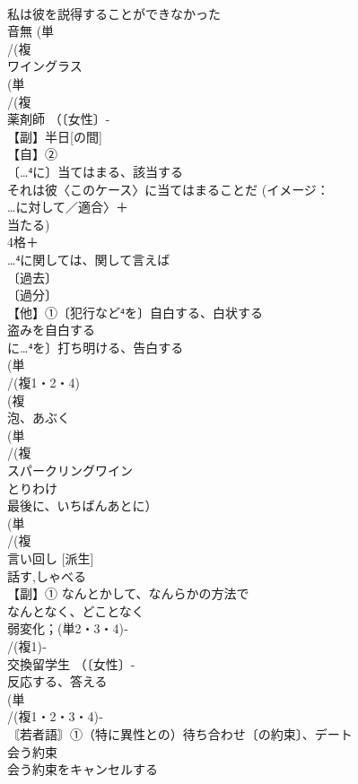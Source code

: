 \documentclass[8pt]{extreport}
\begin{document}
\begin{CJK}{UTF8}{min}
\\	私は彼を説得することができなかった
\\	音無	(単
\\	/(複
\\	ワイングラス 
\\	(単
\\	/(複
\\	薬剤師 （〔女性〕-
\\	【副】半日[の間] 
\\	【自】②
\\	〔…⁴に〕当てはまる、該当する 
\\	それは彼〈このケース〉に当てはまることだ (イメージ： 
\\	…に対して／適合〉＋
\\	当たる)
\\	4格＋
\\	…⁴に関しては、関して言えば
\\	〔過去〕
\\	〔過分〕
\\	【他】①〔犯行など⁴を〕自白する、白状する 
\\	盗みを自白する 
\\	に…⁴を〕打ち明ける、告白する
\\	(単
\\	/(複1・2・4)
\\	(複
\\	泡、あぶく 
\\	(単
\\	/(複
\\	スパークリングワイン 
\\	とりわけ 
\\	最後に、いちばんあとに）
\\	(単
\\	/(複
\\	言い回し [派生] 
\\	話す,しゃべる
\\	【副】① なんとかして、なんらかの方法で 
\\	なんとなく、どことなく
\\	弱変化；(単2・3・4)‐
\\	/(複1)‐
\\	交換留学生 （〔女性〕-
\\	反応する、答える 
\\	(単
\\	/(複1・2・3・4)‐
\\	〘若者語〙①（特に異性との）待ち合わせ〔の約束〕、デート 
\\	会う約束 
\\	会う約束をキャンセルする 

\end{CJK}
\end{document}
